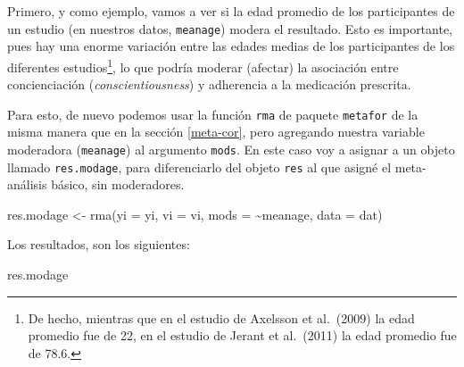 \documentclass[
  bookmarksnumbered]{article}
\newenvironment{Shaded}{\begin{snugshade}}{\end{snugshade}}
\newcommand{\AttributeTok}[1]{\textcolor[rgb]{0.00,0.34,0.68}{#1}}
\newcommand{\FunctionTok}[1]{\textcolor[rgb]{0.39,0.29,0.61}{#1}}
\newcommand{\NormalTok}[1]{\textcolor[rgb]{0.12,0.11,0.11}{#1}}
\newcommand{\OtherTok}[1]{\textcolor[rgb]{0.00,0.43,0.16}{#1}}
\newcommand{\SpecialCharTok}[1]{\textcolor[rgb]{0.24,0.68,0.91}{#1}}
\begin{document}
Primero, y como ejemplo, vamos a ver si la edad promedio de los participantes de un estudio (en nuestros datos, \texttt{meanage}) modera el resultado. Esto es importante, pues hay una enorme variación entre las edades medias de los participantes de los diferentes estudios\footnote{De hecho, mientras que en el estudio de Axelsson et al.~(2009) la edad promedio fue de 22, en el estudio de Jerant et al.~(2011) la edad promedio fue de 78.6.}, lo que podría moderar (afectar) la asociación entre concienciación (\emph{conscientiousness}) y adherencia a la medicación prescrita.

Para esto, de nuevo podemos usar la función \texttt{rma} de paquete \texttt{metafor} de la misma manera que en la sección \ref{meta-cor}, pero agregando nuestra variable moderadora (\texttt{meanage}) al argumento \texttt{mods}. En este caso voy a asignar a un objeto llamado \texttt{res.modage}, para diferenciarlo del objeto \texttt{res} al que asigné el meta-análisis básico, sin moderadores.

\begin{Shaded}
\begin{Highlighting}[]
\NormalTok{res.modage }\OtherTok{\textless{}{-}} \FunctionTok{rma}\NormalTok{(}\AttributeTok{yi =}\NormalTok{ yi, }\AttributeTok{vi =}\NormalTok{ vi, }\AttributeTok{mods =} \SpecialCharTok{\textasciitilde{}}\NormalTok{meanage, }\AttributeTok{data =}\NormalTok{ dat)}
\end{Highlighting}
\end{Shaded}

Los resultados, son los siguientes:

\begin{Shaded}
\begin{Highlighting}[]
\NormalTok{res.modage}
\end{Highlighting}
\end{Shaded}
\end{document}
